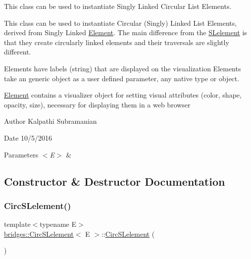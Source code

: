 This class can be used to instantiate Singly Linked Circular List Elements. 

This class can be used to instantiate Circular (Singly) Linked List Elements, derived from Singly Linked \mbox{\hyperlink{classbridges_1_1_element}{Element}}. The main difference from the \mbox{\hyperlink{classbridges_1_1_s_lelement}{S\+Lelement}} is that they create circularly linked elements and their traversals are slightly different.

Elements have labels (string) that are displayed on the visualization Elements take an generic object as a user defined parameter, any native type or object.

\mbox{\hyperlink{classbridges_1_1_element}{Element}} contains a visualizer object for setting visual attributes (color, shape, opacity, size), necessary for displaying them in a web browser

\begin{DoxyAuthor}{Author}
Kalpathi Subramanian 
\end{DoxyAuthor}
\begin{DoxyDate}{Date}
10/5/2016
\end{DoxyDate}

\begin{DoxyParams}{Parameters}
{\em $<$\+E$>$} & \\
\hline
\end{DoxyParams}


\subsection{Constructor \& Destructor Documentation}
\mbox{\label{classbridges_1_1_circ_s_lelement_a86183d3487b906550d8f32bda3a68f98}} 
\subsubsection{\texorpdfstring{Circ\+S\+Lelement()}{CircSLelement()}\hspace{0.1cm}{\footnotesize\ttfamily [1/4]}}
{\footnotesize\ttfamily template$<$typename E$>$ \\
\mbox{\hyperlink{classbridges_1_1_circ_s_lelement}{bridges\+::\+Circ\+S\+Lelement}}$<$ E $>$\+::\mbox{\hyperlink{classbridges_1_1_circ_s_lelement}{Circ\+S\+Lelement}} (\begin{DoxyParamCaption}{ }\end{DoxyParamCaption})\hspace{0.3cm}{\ttfamily [inline]}}

